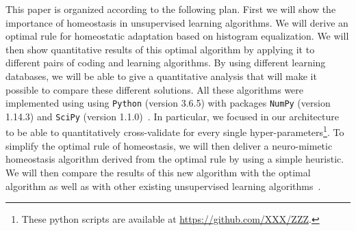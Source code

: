 \documentclass[a4paper, 11pt, draft]{article} %
\begin{document}
This paper is organized according to the following plan. First we will show the importance of homeostasis in unsupervised learning algorithms. We will derive an optimal rule for homeostatic adaptation based on histogram equalization. We will then show quantitative results of this optimal algorithm by applying it to different pairs of coding and learning algorithms. By using different learning databases, we will be able to give a quantitative analysis that will make it possible to compare these different solutions. 
All these algorithms were implemented using using \verb+Python+ (version 3.6.5)
with packages \verb+NumPy+ (version 1.14.3) and \verb+SciPy+ (version 1.1.0)~\citep{Oliphant07}.
In particular, we focused in our architecture to be able to quantitatively cross-validate for every single hyper-parameters\footnote{These python scripts are available at \url{https://github.com/XXX/ZZZ}. %
}. %
To simplify the optimal rule of homeostasis, we will then deliver a neuro-mimetic homeostasis algorithm derived from the optimal rule by using a simple heuristic. We will then compare the results of this new algorithm with the optimal algorithm as well as with other existing unsupervised learning algorithms~\citep{Olshausen97, Sandin17}.
\end{document}
